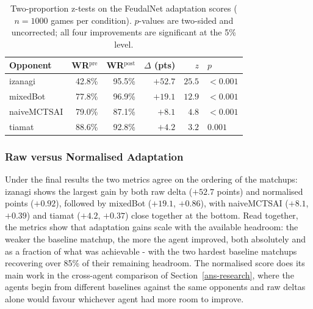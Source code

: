\documentclass[sigconf,review=false]{acmart}
\begin{document}
\begin{table}[t]
  \caption{Two-proportion z-tests on the FeudalNet adaptation
  scores ($n = 1000$ games per condition). $p$-values are two-sided
  and uncorrected; all four improvements are significant at the
  5\% level.}
  \label{tab:feudalnet-significance}
  \begin{tabular}{lrrrrl}
    \toprule
    Opponent & WR$^{\mathrm{pre}}$ & WR$^{\mathrm{post}}$
             & $\Delta$ (pts) & $z$ & $p$ \\
    \midrule
    izanagi     & 42.8\% & 95.5\% & $+52.7$ & $25.5$ & $<0.001$ \\
    mixedBot    & 77.8\% & 96.9\% & $+19.1$ & $12.9$ & $<0.001$ \\
    naiveMCTSAI & 79.0\% & 87.1\% &  $+8.1$ &  $4.8$ & $<0.001$ \\
    tiamat      & 88.6\% & 92.8\% &  $+4.2$ &  $3.2$ & $0.001$  \\
    \bottomrule
  \end{tabular}
\end{table}


\subsubsection{Raw versus Normalised Adaptation}
Under the final results the two metrics agree on the ordering of the matchups: izanagi shows the largest gain by both raw delta ($+52.7$ points) and normalised points ($+0.92$), followed by mixedBot ($+19.1$, $+0.86$), with naiveMCTSAI ($+8.1$, $+0.39$) and tiamat ($+4.2$, $+0.37$) close together at the bottom. 
Read together, the metrics show that adaptation gains scale with the available headroom: the weaker the baseline matchup, the more the agent improved, both absolutely and as a fraction of what was achievable - with the two hardest baseline matchups recovering over 85\% of their remaining headroom. 
The normalised score does its main work in the cross-agent comparison of Section~\ref{ans-research}, where the agents begin from different baselines against the same opponents and raw deltas alone would favour whichever agent had more room to improve.
\end{document}
